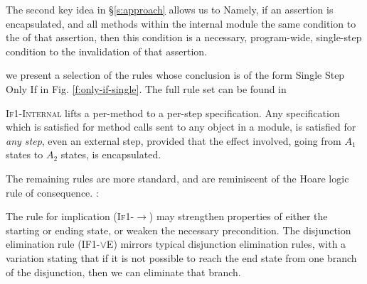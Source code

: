 {The second key idea in \S \ref{s:approach}} allows us to
Namely, if an assertion is encapsulated, and all methods within the internal module
 the same condition to the  of that assertion, then 
this condition is a necessary, program-wide, single-step condition   to the invalidation of that assertion.

 we present a selection of the rules whose conclusion is of the form Single Step Only If in Fig. \ref{f:only-if-single}.
 The full rule set can be found in  %

\textsc{If1-Internal} 
 lifts a  per-method \Nec {} to a per-step \Nec specification.
Any \Nec specification which is satisfied for  method
calls sent to any object in a module, is satisfied for \emph{any step}, even
an external step, provided that the effect involved, \ie going from $A_1$ states to
$A_2$ states, is encapsulated.

 The remaining rules are more standard, and are reminiscent of the Hoare logic rule of consequence.
:
 
The  rule for implication (\textsc{If1-$\longrightarrow$}) may strengthen
 properties of either the starting or ending state, or 
weaken the necessary precondition. 
%
%
The disjunction
elimination rule (\textsc{IF1-$\vee$E}) mirrors typical disjunction elimination
rules, with a variation stating that if it is not possible  to reach 
the end state from one branch of the disjunction, then we can eliminate 
that branch. 


